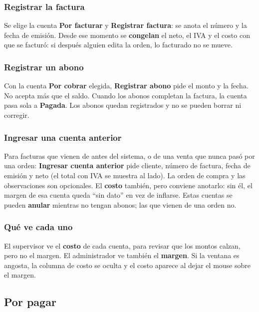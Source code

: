 \documentclass[11pt,a4paper]{article}
\begin{document}
\subsubsection*{Registrar la factura}

Se elige la cuenta \textbf{Por facturar} y \textbf{Registrar factura}: se anota el
número y la fecha de emisión. Desde ese momento se \textbf{congelan} el neto, el
IVA y el costo con que se facturó: si después alguien edita la orden, lo
facturado no se mueve.

\subsubsection*{Registrar un abono}

Con la cuenta \textbf{Por cobrar} elegida, \textbf{Registrar abono} pide el monto
y la fecha. No acepta más que el saldo. Cuando los abonos completan la factura,
la cuenta pasa sola a \textbf{Pagada}. Los abonos quedan registrados y no se
pueden borrar ni corregir.

\subsubsection*{Ingresar una cuenta anterior}

Para facturas que vienen de antes del sistema, o de una venta que nunca pasó por
una orden: \textbf{Ingresar cuenta anterior} pide cliente, número de factura,
fecha de emisión y neto (el total con IVA se muestra al lado). La orden de compra
y las observaciones son opcionales. El \textbf{costo} también, pero conviene
anotarlo: sin él, el margen de esa cuenta queda ``sin dato'' en vez de
inflarse. Estas cuentas se pueden \textbf{anular} mientras no tengan abonos; las
que vienen de una orden no.

\subsubsection*{Qué ve cada uno}

El supervisor ve el \textbf{costo} de cada cuenta, para revisar que los montos
calzan, pero no el margen. El administrador ve también el \textbf{margen}. Si la
ventana es angosta, la columna de costo se oculta y el costo aparece al dejar el
mouse sobre el margen.

\subsection{Por pagar}
\label{sec:por-pagar}
\end{document}
